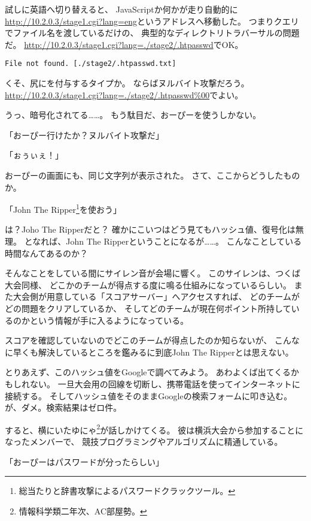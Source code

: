 試しに英語へ切り替えると、
JavaScriptか何かが走り自動的に
\url{http://10.2.0.3/stage1.cgi?lang=eng}というアドレスへ移動した。
つまりクエリでファイル名を渡しているだけの、
典型的なディレクトリトラバーサルの問題だ。
\url{http://10.2.0.3/stage1.cgi?lang=./stage2/.htpasswd}でOK。

\begin{lstlisting}
File not found. [./stage2/.htpasswd.txt]
\end{lstlisting}

くそ、尻にを付与するタイプか。
ならばヌルバイト攻撃だろう。
\url{http://10.2.0.3/stage1.cgi?lang=./stage2/.htpasswd%00}でよい。



うっ、暗号化されてる……。
もう駄目だ、おーぴーを使うしかない。

「おーぴー行けたか？ヌルバイト攻撃だ」

「ぉぅぃぇ！」

おーぴーの画面にも、同じ文字列が表示された。
さて、ここからどうしたものか。

「John The Ripper\footnote{総当たりと辞書攻撃によるパスワードクラックツール。}を使おう」

は？Joho The Ripperだと？
確かにこいつはどう見てもハッシュ値、復号化は無理。
となれば、John The Ripperということになるが……。
こんなことしている時間なんてあるのか？

そんなことをしている間にサイレン音が会場に響く。
このサイレンは、つくば大会同様、
どこかのチームが得点する度に鳴る仕組みになっているらしい。
また大会側が用意している「スコアサーバー」へアクセスすれば、
どのチームがどの問題をクリアしているか、
そしてどのチームが現在何ポイント所持しているのかという情報が手に入るようになっている。

スコアを確認していないのでどこのチームが得点したのか知らないが、
こんなに早くも解決しているところを鑑みるに到底John The Ripperとは思えない。

とりあえず、このハッシュ値をGoogleで調べてみよう。
あわよくば出てくるかもしれない。
一旦大会用の回線を切断し、携帯電話を使ってインターネットに接続する。
そしてハッシュ値をそのままGoogleの検索フォームに叩き込む。
が、ダメ。検索結果はゼロ件。

すると、横にいたゆにゃ\footnote{情報科学類二年次、AC部屋勢。}が話しかけてくる。
彼は横浜大会から参加することになったメンバーで、
競技プログラミングやアルゴリズムに精通している。

「おーぴーはパスワードが分ったらしい」

